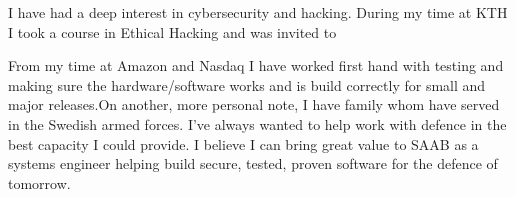 \documentclass[../../main.tex]{subfiles}
\begin{document}
I have had a deep interest in cybersecurity and hacking. During my time at KTH I took a course in Ethical Hacking and was invited to 

From my time at Amazon and Nasdaq I have worked first hand with testing and making sure the hardware/software works and is build correctly for small and major releases.On another, more personal note, I have family whom have served in the Swedish armed forces. I've always wanted to help work with defence in the best capacity I could provide. I believe I can bring great value to SAAB as a systems engineer helping build secure, tested, proven software for the defence of tomorrow.
\\
\end{document}
